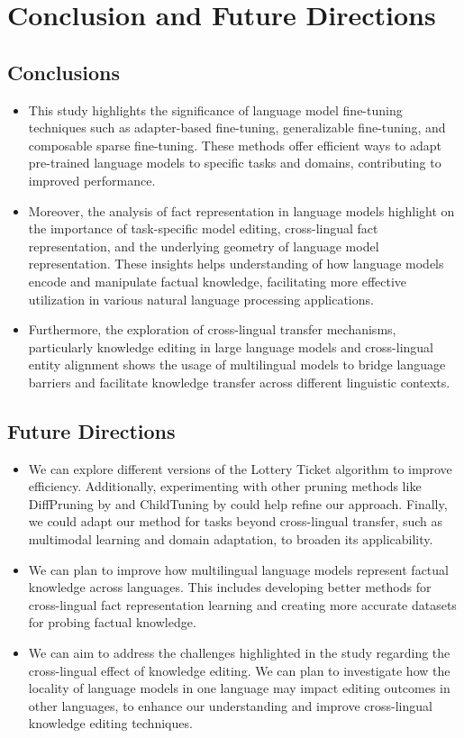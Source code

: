 \chapter{Conclusion and Future Directions}\label{chp: Conclusions}
\section{Conclusions} 
\begin{itemize}
	\item This study highlights the significance of language model fine-tuning techniques such as adapter-based fine-tuning, generalizable fine-tuning, and composable sparse fine-tuning. These methods offer efficient ways to adapt pre-trained language models to specific tasks and domains, contributing to improved performance.
	
	\item Moreover, the analysis of fact representation in language models highlight on the importance of task-specific model editing, cross-lingual fact representation, and the underlying geometry of language model representation. These insights helps understanding of how language models encode and manipulate factual knowledge, facilitating more effective utilization in various natural language processing applications.
	
	\item Furthermore, the exploration of cross-lingual transfer mechanisms, particularly knowledge editing in large language models and cross-lingual entity alignment shows the usage of multilingual models to bridge language barriers and facilitate knowledge transfer across different linguistic contexts.
\end{itemize}

\section{Future Directions} 
\begin{itemize}
	\item We can explore different versions of the Lottery Ticket algorithm to improve efficiency. Additionally, experimenting with other pruning methods like DiffPruning by \citet{guo2021parameterefficient} and ChildTuning by \citet{xu2021raise} could help refine our approach. Finally, we could adapt our method for tasks beyond cross-lingual transfer, such as multimodal learning and domain adaptation, to broaden its applicability.
	
	\item We can plan to improve how multilingual language models represent factual knowledge across languages. This includes developing better methods for cross-lingual fact representation learning and creating more accurate datasets for probing factual knowledge. 
	
	\item We can aim to address the challenges highlighted in the study regarding the cross-lingual effect of knowledge editing. We can plan to investigate how the locality of language models in one language may impact editing outcomes in other languages, to enhance our understanding and improve cross-lingual knowledge editing techniques.
\end{itemize}
